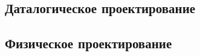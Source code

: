 \subsection{Даталогическое проектирование}
\label{ssub:db_data_stage}

\subsection{Физическое проектирование}
\label{ssub:db_physical_stage}













